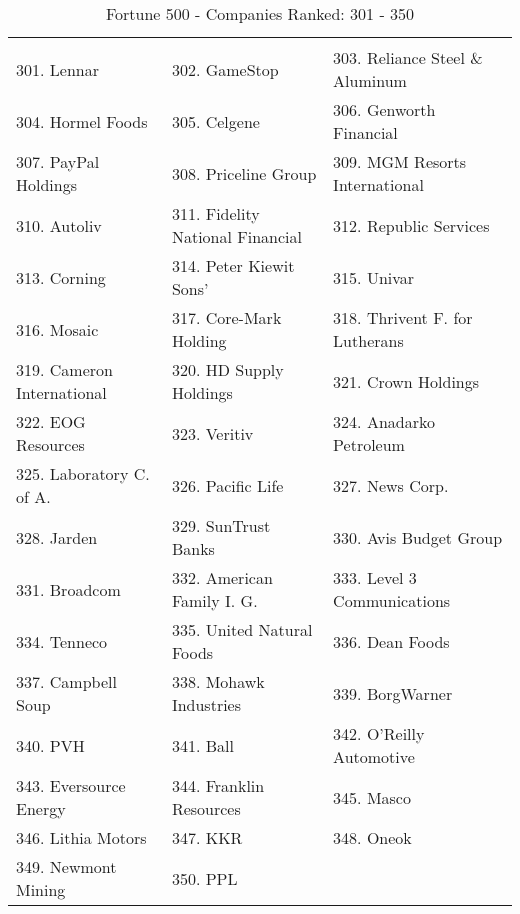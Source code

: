 \documentclass{article}
\begin{document}
\begin{table}[H]
\centering
\caption{Fortune 500 - Companies Ranked: 301 - 350}
\begin{tabular}{lll}
\hline
 \\ 301. Lennar 
&  302. GameStop 
&  303. Reliance Steel \& Aluminum 
\\ 304. Hormel Foods 
&  305. Celgene 
&  306. Genworth Financial 
\\ 307. PayPal Holdings 
&  308. Priceline Group 
&  309. MGM Resorts International 
\\ 310. Autoliv 
&  311. Fidelity National Financial 
&  312. Republic Services 
\\ 313. Corning 
&  314. Peter Kiewit Sons' 
&  315. Univar 
\\ 316. Mosaic 
&  317. Core-Mark Holding 
&  318. Thrivent F. for Lutherans 
\\ 319. Cameron International 
&  320. HD Supply Holdings 
&  321. Crown Holdings 
\\ 322. EOG Resources 
&  323. Veritiv 
&  324. Anadarko Petroleum 
\\ 325. Laboratory C. of A. 
&  326. Pacific Life 
&  327. News Corp. 
\\ 328. Jarden 
&  329. SunTrust Banks 
&  330. Avis Budget Group 
\\ 331. Broadcom 
&  332. American Family I. G. 
&  333. Level 3 Communications 
\\ 334. Tenneco 
&  335. United Natural Foods 
&  336. Dean Foods 
\\ 337. Campbell Soup 
&  338. Mohawk Industries 
&  339. BorgWarner 
\\ 340. PVH 
&  341. Ball 
&  342. O'Reilly Automotive 
\\ 343. Eversource Energy 
&  344. Franklin Resources 
&  345. Masco 
\\ 346. Lithia Motors 
&  347. KKR 
&  348. Oneok 
\\ 349. Newmont Mining 
&  350. PPL 
&   
 \\ \hline

\end{tabular}
\end{table}
\end{document}
